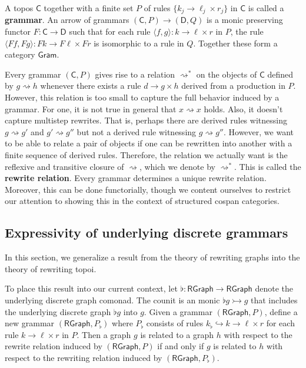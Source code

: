 \documentclass{amsart}
\newcommand{\C}{\cat{C}}
\newcommand{\D}{\cat{D}}
\newcommand{\RGraph}{\cat{RGraph}}
\newcommand{\Gram}{\cat{Gram}}
\newcommand{\defn}[1]{\textbf{#1}}
\newcommand{\cat}[1]{\mathsf{#1}}
\newcommand{\from}{\colon}
\newcommand{\monicto}{\rightarrowtail}
\newcommand{\dderiv}[2]{#1 \rightsquigarrow #2}
\newcommand{\deriv}[2]{#1 \rightsquigarrow^\ast #2}
\newcommand{\spn}[3]{#2 \to #1 \times #3}
\theoremstyle{remark}
\theoremstyle{definition}
\begin{document}
A topos $ \C $ together with a finite set $ P $ of rules
$ \{ \spn{\ell_j}{k_j}{r_j} \} $ in $ \cat{ C } $ is called a
\defn{grammar}. An arrow of grammars $ ( \C , P ) \to ( \D , Q ) $ is
a monic preserving functor $ F \from \C \to \D $ such that for each
rule $ \langle f,g \rangle \from \spn{\ell}{k}{r} $ in $ P $, the rule
$ \langle Ff,Fg \rangle \from \spn{F\ell}{Fk}{Fr} $ is isomorphic to a rule
in $ Q $. Together these form a category $ \Gram $.

Every grammar $ ( \C , P ) $ gives rise to a relation $ \deriv{}{} $
on the objects of $ \C $ defined by $ \dderiv{g}{h} $ whenever there
exists a rule $ \spn{g}{d}{h} $ derived from a production in $ P
$. However, this relation is too small to capture the full behavior
induced by a grammar.  For one, it is not true in general that
$ \dderiv{x}{x} $ holds. Also, it doesn't capture multistep
rewrites. That is, perhaps there are derived rules witnessing
$ \dderiv{g}{g'} $ and $ \dderiv{g'}{g''} $ but not a derived rule
witnessing $ \dderiv{g}{g''} $. However, we want to be able to relate
a pair of objects if one can be rewritten into another with a finite
sequence of derived rules. Therefore, the relation we actually want is
the reflexive and transitive closure of $ \rightsquigarrow $, which we
denote by $ \rightsquigarrow^\ast $.  This is called the \defn{rewrite
  relation}.  Every grammar determines a unique rewrite
relation. Moreover, this can be done functorially, though we content
ourselves to restrict our attention to showing this in the context of
structured cospan categories.

\subsection{Expressivity of underlying discrete grammars}
\label{sec:gen-result-graph-rewriting}

In this section, we generalize a result
\cite[Prop.~3.3]{Ehrig_GraphGram} from the theory of rewriting graphs
into the theory of rewriting topoi.

To place this result into our current context, let
$ \flat \from \RGraph \to \RGraph $ denote the underlying discrete
graph comonad. The counit is an monic $ \flat g \monicto g $ that
includes the underlying discrete graph $ \flat g $ into $ g $.  Given
a grammar $ ( \RGraph , P ) $, define a new grammar
$ ( \RGraph , P_\flat ) $ where $ P_\flat $ consists of rules
$ k_\flat \hookrightarrow k \to \ell \times r $ for each rule
$ \spn{\ell}{k}{r} $ in $ P $. Then a graph $ g $ is related to a
graph $ h $ with respect to the rewrite relation induced by
$ ( \RGraph , P ) $ if and only if $ g $ is related to $ h $ with
respect to the rewriting relation induced by
$ ( \RGraph , P_\flat ) $.
\end{document}
